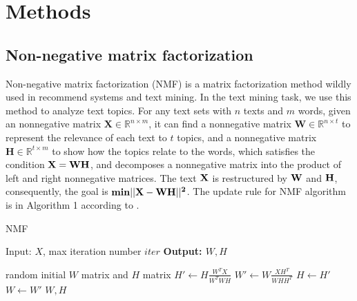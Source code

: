 \documentclass[english,onecolumn]{IEEEtran}
\begin{document}
	\section{Methods}
	
		\subsection{Non-negative matrix factorization}
	Non-negative matrix factorization (NMF) is a matrix factorization method wildly used in recommend systems and text mining. In the text mining task, we use this method to analyze text topics. For any text sets with $n$ texts and $m$ words, given an nonnegative matrix $\mathbf{X}\in\mathbb{R}^{n\times m}$, it can find a nonnegative matrix $\mathbf{W}\in\mathbb{R}^{n\times t}$ to represent the relevance of each text to $t$ topics, and a nonnegative matrix $\mathbf{H}\in\mathbb{R}^{t \times m}$ to show how the topics relate to the words, which satisfies the condition $\bf X=WH$, and decomposes a nonnegative matrix into the product of left and right nonnegative matrices. The text $\bf X$ is restructured by $\bf W$ and $\bf H$, consequently, the goal is $\bf min||X-WH||^2$. The update rule for NMF algorithm is in Algorithm 1 according to \cite{nips}.
	
	\begin{algorithm}[t]
		\caption{NMF} %
		\hspace*{0.02in} { Input: $X$, max iteration number $iter$} %
		\hspace*{0.02in} {\bf Output: $W,H$} %
		\label{NMF}
		\begin{algorithmic}[1]
			\State random initial $W$ matrix and $H$ matrix %
			\State  $H'\leftarrow H \frac{W^TX}{W^TWH}$
			\State $W'\leftarrow W\frac{XH^T}{WHH^T}$
			\State $H\leftarrow H'$
			\State $W\leftarrow W'$
			\EndFor
			\Return $W,H$
		\end{algorithmic}
	\end{algorithm}
\end{document}
